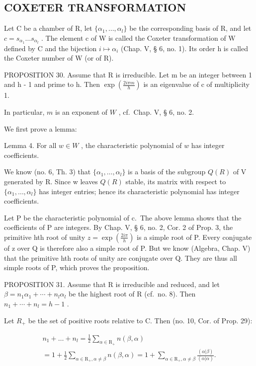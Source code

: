 \subsection{COXETER TRANSFORMATION}

Let C be a chamber of R, let \(\{\alpha_{1},\ldots,\alpha_{l}\}\) be the corresponding basis of R, and let \(c=s_{\alpha_{1}}\ldots s_{\alpha_{l}}\) . The element c of W is called the Coxeter transformation of W defined by C and the bijection \(i\mapsto\alpha_{i}\) (Chap. V, § 6, no. 1). Its order h is called the Coxeter number of W (or of R).

PROPOSITION 30. Assume that R is irreducible. Let m be an integer between 1 and h - 1 and prime to h. Then \(\exp\left(\frac{2i\pi m}{h}\right)\) is an eigenvalue of c of multiplicity 1.

In particular, \(m\) is an exponent of \(W\) , cf.~Chap. V, § 6, no. 2.

We first prove a lemma:

Lemma 4. For all \(w \in W\) , the characteristic polynomial of \(w\) has integer coefficients.

We know (no. 6, Th. 3) that \(\{\alpha_{1},\ldots,\alpha_{l}\}\) is a basis of the subgroup \(Q(R)\) of V generated by R. Since w leaves \(Q(R)\) stable, its matrix with respect to \(\{\alpha_{1},\ldots,\alpha_{l}\}\) has integer entries; hence its characteristic polynomial has integer coefficients.

Let P be the characteristic polynomial of c.~The above lemma shows that the coefficients of P are integers. By Chap. V, § 6, no. 2, Cor. 2 of Prop. 3, the primitive hth root of unity \(z = \exp\left(\frac{2i\pi}{h}\right)\) is a simple root of P. Every conjugate of z over Q is therefore also a simple root of P. But we know (Algebra, Chap. V) that the primitive hth roots of unity are conjugate over Q. They are thus all simple roots of P, which proves the proposition.

PROPOSITION 31. Assume that R is irreducible and reduced, and let \(\beta = n_{1}\alpha_{1} + \cdots + n_{l}\alpha_{l}\) be the highest root of R (cf.~no. 8). Then \(n_{1} + \cdots + n_{l} = h - 1\) .

Let \(R_{+}\) be the set of positive roots relative to C. Then (no. 10, Cor. of Prop. 29):

\[
\begin{array}{l} n _ {1} + \dots + n _ {l} = \frac {1}{2} \sum_ {\alpha \in \mathrm{R} _ {+}} n (\beta , \alpha) \\ = 1 + \frac {1}{2} \sum_ {\alpha \in \mathrm{R} _ {+}, \alpha \neq \beta} n (\beta , \alpha) = 1 + \sum_ {\alpha \in \mathrm{R} _ {+}, \alpha \neq \beta} \frac {(\alpha | \beta)}{(\alpha | \alpha)}. \end{array}
\]

